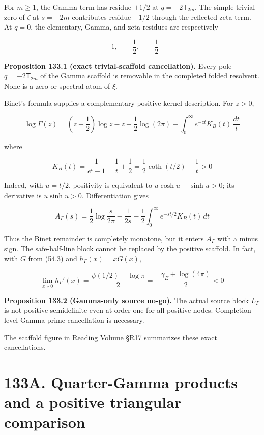 \documentclass[
  11pt,
]{book}
\renewenvironment{quote}
  {\begin{tcolorbox}[
      enhanced,
      breakable,
      colback=tncream,
      colframe=tnrust,
      boxrule=0.8pt,
      arc=1.5pt,
      left=7pt,
      right=7pt,
      top=6pt,
      bottom=6pt]}
  {\end{tcolorbox}}
\begin{document}
For \(m\ge1\), the Gamma term has residue \(+1/2\) at
\(q=-2\mathsf T_{2m}\). The simple trivial zero of \(\zeta\) at
\(s=-2m\) contributes residue \(-1/2\) through the reflected zeta term.
At \(q=0\), the elementary, Gamma, and zeta residues are respectively

\[
-1,\qquad\frac12,\qquad\frac12
\tag{133.3}
\]

\begin{quote}
\textbf{Proposition 133.1 (exact trivial-scaffold cancellation).} Every
pole \(q=-2\mathsf T_{2m}\) of the Gamma scaffold is removable in the
completed folded resolvent. None is a zero or spectral atom of \(\xi\).
\end{quote}

Binet's formula supplies a complementary positive-kernel description.
For \(z>0\),

\[
\log\Gamma(z)
=\left(z-\frac12\right)\log z-z+\frac12\log(2\pi)
+\int_0^\infty e^{-zt}K_B(t)\,\frac{dt}{t}
\tag{133.4}
\]

where

\[
K_B(t)
=\frac1{e^t-1}-\frac1t+\frac12
=\frac12\coth(t/2)-\frac1t>0
\tag{133.5}
\]

Indeed, with \(u=t/2\), positivity is equivalent to
\(u\cosh u-\sinh u>0\); its derivative is \(u\sinh u>0\).
Differentiation gives

\[
A_\Gamma(s)
=\frac12\log\frac{s}{2\pi}-\frac1{2s}
-\frac12\int_0^\infty e^{-st/2}K_B(t)\,dt
\tag{133.6}
\]

Thus the Binet remainder is completely monotone, but it enters
\(A_\Gamma\) with a minus sign. The safe-half-line block cannot be
replaced by the positive scaffold. In fact, with \(G\) from (54.3) and
\(h_\Gamma(x)=xG(x)\),

\[
\boxed{
\lim_{x\downarrow0}h_\Gamma'(x)
=\frac{\psi(1/2)-\log\pi}{2}
=-\frac{\gamma_E+\log(4\pi)}2<0
}
\tag{133.7}
\]

\begin{quote}
\textbf{Proposition 133.2 (Gamma-only source no-go).} The actual source
block \(L_\Gamma\) is not positive semidefinite even at order one for
all positive nodes. Completion-level Gamma-prime cancellation is
necessary.
\end{quote}

The scaffold figure in Reading Volume §R17 summarizes these exact
cancellations.

\section{133A. Quarter-Gamma products and a positive triangular
comparison}\label{a.-quarter-gamma-products-and-a-positive-triangular-comparison}
\end{document}
